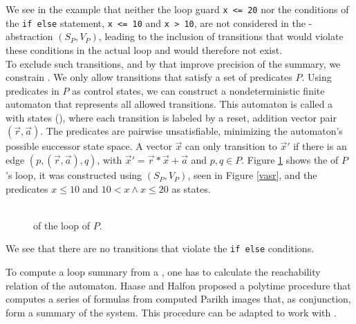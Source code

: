 
\begin{comment}
	\jw{Introduction qvasrs $\rightarrow$ summary precision improvement \\
	- What are qvasr? How to compute their reachability relation $\rightarrow$ Parikh image? \\ 
	How do they improve precision? \\
	- running example to qvasrs \\
	\vspace{1cm}
	15 pages}
\end{comment}

We see in the example that neither the loop guard \texttt{x <= 20} nor the conditions of the \texttt{if else} statement, \texttt{x <= 10} and \texttt{x > 10}, are not considered in the \qvasr-abstraction $(S_P, V_P)$, leading to the inclusion of transitions that would violate these conditions in the actual loop and would therefore not exist. \\
To exclude such transitions, and by that improve precision of the summary, we constrain \qvasr. We only allow transitions that satisfy a set of predicates $P$. Using predicates in $P$ as control states, we can construct a nondeterministic finite automaton that represents all allowed transitions. This automaton is called a \qvasr with states (\qvasrs), where each transition is labeled by a reset, addition vector pair $(\vec{r}, \vec{a})$. The predicates are pairwise unsatisfiable, minimizing the automaton's possible successor state space. A vector $\vec{x}$ can only transition to $\vec{x}'$ if there is an edge $(p, (\vec{r}, \vec{a}), q)$, with $\vec{x}' = \vec{r} * \vec{x} + \vec{a}$ and $p, q \in P$.
Figure \ref{vasrs} shows the \qvasrs of $P$'s loop, it was constructed using $(S_P, V_P)$, seen in Figure \ref{vasr}, and the predicates $x \leq 10$ and $10 < x \land x \leq 20$ as states.
\begin{figure}[H]
	
	\caption{\\ \qvasrs of the loop of $P$.}
	\label{vasrs}
\end{figure}
We see that there are no transitions that violate the \texttt{if else} conditions. \par
To compute a loop summary from a \qvasrs, one has to calculate the reachability relation of the automaton. Haase and Halfon \cite{DBLP:conf/rp/HaaseH14} proposed a polytime procedure that computes a series of formulas from computed Parikh images that, as conjunction, form a summary of the system. This procedure can be adapted to work with \qvasrs. \\ \par